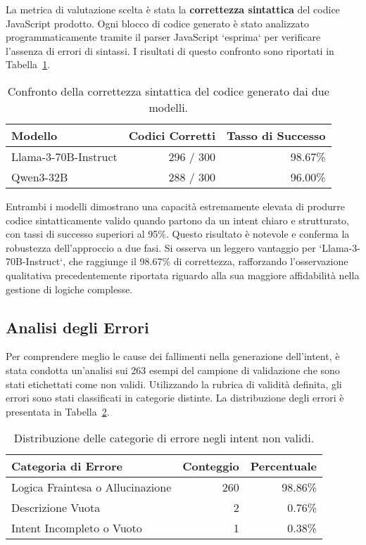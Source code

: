 \documentclass[sigconf,natbib=false]{acmart}
\begin{document}
La metrica di valutazione scelta è stata la \textbf{correttezza sintattica} del codice JavaScript prodotto. Ogni blocco di codice generato è stato analizzato programmaticamente tramite il parser JavaScript `esprima` per verificare l'assenza di errori di sintassi. I risultati di questo confronto sono riportati in Tabella~\ref{tab:syntax_correctness}.

\begin{table}[h!]
\centering
\begin{tabular}{lrr}
\toprule
\textbf{Modello} & \textbf{Codici Corretti} & \textbf{Tasso di Successo} \\
\midrule
Llama-3-70B-Instruct & 296 / 300 & 98.67\% \\
Qwen3-32B     & 288 / 300 & 96.00\% \\
\bottomrule
\end{tabular}
\caption{Confronto della correttezza sintattica del codice generato dai due modelli.}
\label{tab:syntax_correctness}
\end{table}

Entrambi i modelli dimostrano una capacità estremamente elevata di produrre codice sintatticamente valido quando partono da un intent chiaro e strutturato, con tassi di successo superiori al 95\%. Questo risultato è notevole e conferma la robustezza dell'approccio a due fasi. Si osserva un leggero vantaggio per `Llama-3-70B-Instruct`, che raggiunge il 98.67\% di correttezza, rafforzando l'osservazione qualitativa precedentemente riportata riguardo alla sua maggiore affidabilità nella gestione di logiche complesse.

\subsection{Analisi degli Errori}
Per comprendere meglio le cause dei fallimenti nella generazione dell'intent, è stata condotta un'analisi sui 263 esempi del campione di validazione che sono stati etichettati come non validi. Utilizzando la rubrica di validità definita, gli errori sono stati classificati in categorie distinte. La distribuzione degli errori è presentata in Tabella~\ref{tab:error_analysis}.

\begin{table}[h!]
\centering
\begin{tabular}{lrr}
\toprule
Categoria di Errore & Conteggio & Percentuale \\
\midrule
Logica Fraintesa o Allucinazione & 260 & 98.86\% \\
Descrizione Vuota & 2 & 0.76\% \\
Intent Incompleto o Vuoto & 1 & 0.38\% \\
\bottomrule
\end{tabular}
\caption{Distribuzione delle categorie di errore negli intent non validi.}
\label{tab:error_analysis}
\end{table}
\end{document}
